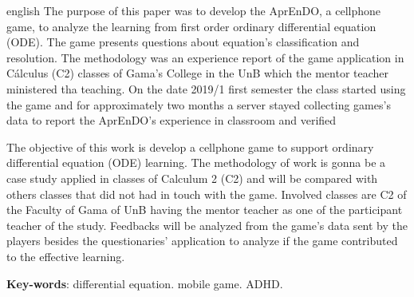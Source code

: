 \begin{resumo}[Abstract]
 \begin{otherlanguage*}{english}     
The purpose of this paper was to develop the AprEnDO, a cellphone game, to analyze the learning from first order ordinary differential equation (ODE). The game presents questions about equation's classification and resolution. The methodology was an experience report of the game application in Cálculus (C2) classes of Gama's College in the UnB which the mentor teacher ministered tha teaching. On the date 2019/1 first semester the class started using the game and for approximately two months a server stayed collecting games's data to report the AprEnDO's experience in classroom and verified 

   The objective of this work is develop a cellphone game to support ordinary differential equation (ODE) learning. The methodology of work is gonna be a case study applied in classes of Calculum 2 (C2) and will be compared with others classes that did not had in touch with the game. Involved classes are C2 of the Faculty of Gama of UnB having the mentor teacher as one of the participant teacher of the study. Feedbacks will be analyzed from the game's data sent by the players besides the questionaries' application to analyze if the game contributed to the effective learning.
   
   \begin{comment}
   metodologia 
   revisão bibliográfica 
   estudo de caso 
      software educacional 
   ensino equações diferenciais ordinárias
   auxílio de aprendizagem de EDO
   Faculdade do Gama
   diagnostico através da avaliação
   aplicação de questionário
   \end{comment}
   

   \vspace{\onelineskip}
 
   \noindent 
   \textbf{Key-words}: differential equation. mobile game. ADHD.
 \end{otherlanguage*}
\end{resumo}
